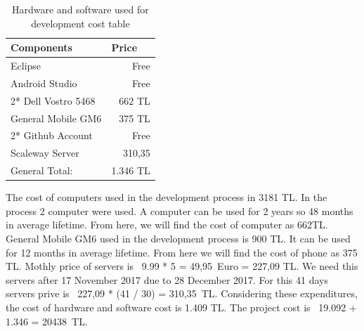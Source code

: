 \begin{table}[!h!]
\centering
\caption{Hardware and software used for development cost table}
\label{tab:hardsoftcost}
\begin{tabular}{|l|r|}
\hline
\textbf{Components}             & \multicolumn{1}{l|}{\textbf{Price}} \\ \hline
Eclipse \cite{eclipse} & Free \\ \hline
Android Studio \cite{androidStudio} & Free \\ \hline
2* Dell Vostro 5468 \cite{dell} & 662 TL \\ \hline
General Mobile GM6 \cite{gm6} & 375 TL                            \\ \hline
2* Github Account                  & Free                             \\ \hline
Scaleway Server                  & 310,35                            \\ \hline
General Total:                  & 1.346 TL                            \\ \hline
\end{tabular}
\end{table}
The cost of computers used in the development process in 3181 TL\cite{dell}. In the process 2 computer were used. A computer can be used for 2 years so 48 months in average lifetime. From here, we will find the cost of computer as 662TL. General Mobile GM6 used in the development process is 900 TL\cite{gm6}. It can be used for 12 months in average lifetime. From here we will find the cost of phone as 375 TL. Mothly price of servers is \ 9.99 * 5 = 49,95\ Euro = 227,09 TL. We need this servers after 17 November 2017 due to 28 December 2017. For this 41 days servers prive is \ 227,09 * (41 / 30) = 310,35\ TL. Considering these expenditures, the cost of hardware and software cost is 1.409 TL. The project cost is \ 19.092 + 1.346 = 20438\ TL.
